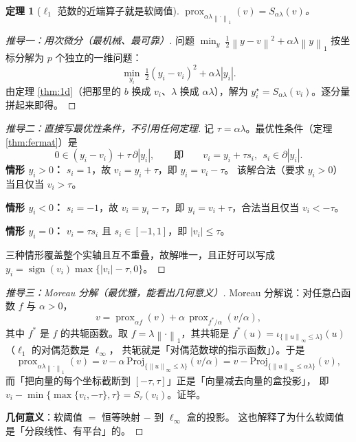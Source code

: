\documentclass[11pt,a4paper,UTF8]{ctexart}
\theoremstyle{plain}
\newtheorem{theorem}{定理}[section]
\theoremstyle{definition}
\theoremstyle{remark}
\newcommand{\norm}[1]{\left\lVert #1 \right\rVert}
\newcommand{\abs}[1]{\left\lvert #1 \right\rvert}
\newcommand{\prox}{\operatorname{prox}}
\DeclareMathOperator{\sign}{sign}
\begin{document}
\begin{theorem}[$\ell_1$ 范数的近端算子就是软阈值]\label{thm:soft}
$\prox_{\alpha\lambda\norm{\cdot}_1}(v)=S_{\alpha\lambda}(v)$。
\end{theorem}

\begin{proof}[推导一：用次微分（最机械、最可靠）]
问题 $\min_y\ \tfrac12\norm{y-v}^2+\alpha\lambda\norm y_1$ 按坐标分解为 $p$ 个独立的一维问题：
\[
\min_{y_i}\ \tfrac12(y_i-v_i)^2+\alpha\lambda\abs{y_i}.
\]
由定理 \ref{thm:1d}（把那里的 $b$ 换成 $v_i$、$\lambda$ 换成 $\alpha\lambda$），解为
$y_i^\star=S_{\alpha\lambda}(v_i)$。逐分量拼起来即得。
\end{proof}

\begin{proof}[推导二：直接写最优性条件，不引用任何定理]
记 $\tau=\alpha\lambda$。最优性条件（定理 \ref{thm:fermat}）是
\[
0\in (y_i-v_i)+\tau\,\partial\abs{y_i},\qquad\text{即}\qquad v_i=y_i+\tau s_i,\ \ s_i\in\partial\abs{y_i}.
\]
\textbf{情形 $y_i>0$：} $s_i=1$，故 $v_i=y_i+\tau$，即 $y_i=v_i-\tau$。
该解合法（要求 $y_i>0$）当且仅当 $v_i>\tau$。

\textbf{情形 $y_i<0$：} $s_i=-1$，故 $v_i=y_i-\tau$，即 $y_i=v_i+\tau$，合法当且仅当 $v_i<-\tau$。

\textbf{情形 $y_i=0$：} $v_i=\tau s_i$ 且 $s_i\in[-1,1]$，即 $\abs{v_i}\le\tau$。

三种情形覆盖整个实轴且互不重叠，故解唯一，且正好可以写成
$y_i=\sign(v_i)\max\{\abs{v_i}-\tau,0\}$。
\end{proof}

\begin{proof}[推导三：Moreau 分解（最优雅，能看出几何意义）]
Moreau 分解说：对任意凸函数 $f$ 与 $\alpha>0$，
\[
v=\prox_{\alpha f}(v)+\alpha\,\prox_{f^\ast/\alpha}(v/\alpha),
\]
其中 $f^\ast$ 是 $f$ 的共轭函数。取 $f=\lambda\norm{\cdot}_1$，其共轭是
$f^\ast(u)=\iota_{\{\norm u_\infty\le\lambda\}}(u)$（$\ell_1$ 的对偶范数是 $\ell_\infty$，
共轭就是「对偶范数球的指示函数」）。于是
\[
\prox_{\alpha\lambda\norm{\cdot}_1}(v)
=v-\alpha\,\mathrm{Proj}_{\{\norm u_\infty\le\lambda\}}(v/\alpha)
=v-\mathrm{Proj}_{\{\norm u_\infty\le\alpha\lambda\}}(v),
\]
而「把向量的每个坐标截断到 $[-\tau,\tau]$」正是「向量减去向量的盒投影」，
即 $v_i-\min\{\max\{v_i,-\tau\},\tau\}=S_\tau(v_i)$。证毕。

\textbf{几何意义}：软阈值 $=$ 恒等映射 $-$ 到 $\ell_\infty$ 盒的投影。
这也解释了为什么软阈值是「分段线性、有平台」的。
\end{proof}
\end{document}
